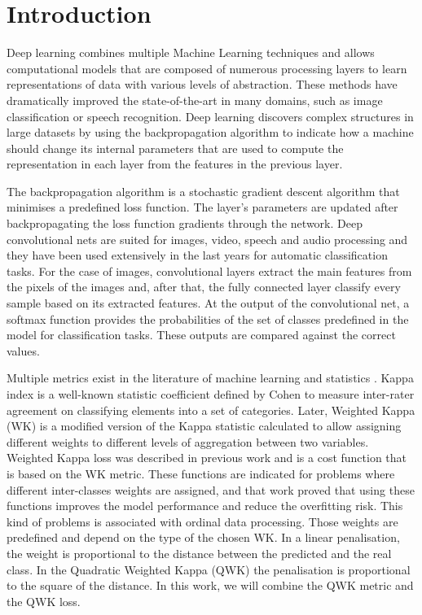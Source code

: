\documentclass[10pt, a4paper, titlepage, twocolumn]{article}
\begin{document}
	\selectfont
		
	\section{Introduction}
	\label{sect:introduction}
	Deep learning \cite{lecun2015deep} combines multiple Machine Learning techniques and allows computational models that are composed of numerous processing layers to learn representations of data with various levels of abstraction. These methods have dramatically improved the state-of-the-art in many domains, such as image classification or speech recognition. Deep learning discovers complex structures in large datasets by using the backpropagation algorithm to indicate how a machine should change its internal parameters that are used to compute the representation in each layer from the features in the previous layer.
	
	The backpropagation algorithm is a stochastic gradient descent algorithm that minimises a predefined loss function. The layer's parameters are updated after backpropagating the loss function gradients through the network. Deep convolutional nets are suited for images, video, speech and audio processing and they have been used extensively in the last years for automatic classification tasks. For the case of images, convolutional layers extract the main features from the pixels of the images and, after that, the fully connected layer classify every sample based on its extracted features. At the output of the convolutional net, a softmax function provides the probabilities of the set of classes predefined in the model for classification tasks. These outputs are compared against the correct values.
	
	Multiple metrics exist in the literature of machine learning and statistics \cite{cruz2014metrics}\cite{mehdiyev2016evaluating}. Kappa index is a well-known statistic coefficient defined by Cohen \cite{cohen1960coefficient} to measure inter-rater agreement on classifying elements into a set of categories. Later, Weighted Kappa (WK) is a modified version of the Kappa statistic calculated to allow assigning different weights to different levels of aggregation between two variables. Weighted Kappa loss was described in previous work \cite{de2018weighted} and is a cost function that is based on the WK metric. These functions are indicated for problems where different inter-classes weights are assigned, and that work proved that using these functions improves the model performance and reduce the overfitting risk. This kind of problems is associated with ordinal data processing. Those weights are predefined and depend on the type of the chosen WK. In a linear penalisation, the weight is proportional to the distance between the predicted and the real class. In the Quadratic Weighted Kappa (QWK) the penalisation is proportional to the square of the distance. In this work, we will combine the QWK metric and the QWK loss.
	
\end{document}
